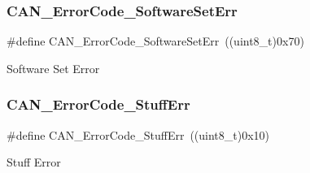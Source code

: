 \subsubsection{\texorpdfstring{CAN\_ErrorCode\_SoftwareSetErr}{CAN\_ErrorCode\_SoftwareSetErr}}
{\footnotesize\ttfamily \#define C\+A\+N\+\_\+\+Error\+Code\+\_\+\+Software\+Set\+Err~((uint8\+\_\+t)0x70)}

Software Set Error \mbox{\label{group___c_a_n___error___code__constants_gaa733d1c078472912c3bf60fbdc53734d}} 
\subsubsection{\texorpdfstring{CAN\_ErrorCode\_StuffErr}{CAN\_ErrorCode\_StuffErr}}
{\footnotesize\ttfamily \#define C\+A\+N\+\_\+\+Error\+Code\+\_\+\+Stuff\+Err~((uint8\+\_\+t)0x10)}

Stuff Error 